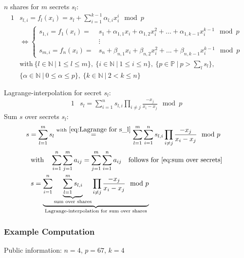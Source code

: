 		$n$ shares for $m$ secrets $s_l$:
		\begin{alignat}{1}
			&s_{l,i} = f_l(x_i) = s_l + \sum_{i=1}^{k-1} \alpha_{l,i} x_i^i \mod p \\
			& \Leftrightarrow \begin{cases}
				s_{1,i} = f_1(x_i) = & s_1 + \alpha_{1,1} x_i + \alpha_{1,2} x_i^2 + ... + \alpha_{1,k-1}x_i^{k-1} \mod p \\
				&\vdots \\
				s_{m,i} = f_n(x_i) = & s_n + \beta_{n,1} x_i + \beta_{n,2} x_i^2 + ... + \beta_{n,k-1}x_i^{k-1} \mod p
			  \end{cases} \nonumber \\
			& \text{with} \ \{l \in \mathbb{N} \ | \ 1 \leq l \leq m \},
			\ \{i \in \mathbb{N} \ | \ 1 \leq i \leq n \},
			\ \{ p \in \mathbb{P} \ | \ p > \sum_l s_l \}, \nonumber \\
			&\{ \alpha \in \mathbb{N} \ | \ 0 \leq \alpha \leq p \},
			\ \{k \in \mathbb{N} \ | \ 2 < k \leq n \} \nonumber
		\end{alignat}
		
		Lagrange-interpolation for secret $s_l$:
		\begin{alignat}{1}
			&s_l = \sum_{i=1}^{n}s_{l,i}\prod_{i\neq j}\frac{-x_j}{x_i - x_j} \mod p \label{eq:Lagrange for s_l}
		\end{alignat}
		Sum $s$ over secrets $s_l$:
		\begin{alignat}{1}
			&s = \sum_{l=1}^{m} s_l \overset{\text{with} \ \ref{eq:Lagrange for s_l}}{=} \sum_{l=1}^{m} \sum_{i=1}^{n} s_{l,i}\prod_{i\neq j} \frac{-x_j}{x_i-x_j} \mod p \label{eq:sum over secrets}
		\end{alignat}
		\begin{alignat}{1}
		&\text{with} \quad \sum_{i=1}^{n}\sum_{j=1}^{m}a_{ij} = \sum_{j=1}^{m}\sum_{i=1}^{n}a_{ij} \quad \text{follows for \ref{eq:sum over secrets}} \nonumber\\
		&s= \underbrace{ \sum_{i=1}^n \underbrace{\sum_{l=1}^{m} s_{l,i}}_{\text{sum over shares}} \prod_{i\neq j} \frac{-x_j}{x_i-x_j} \mod p }_{\text{Lagrange-interpolation for sum over shares}}
		\end{alignat}	
		
		\subsubsection*{Example Computation}
		Public information: $n=4$, $p=67$, $k=4$\par
		
